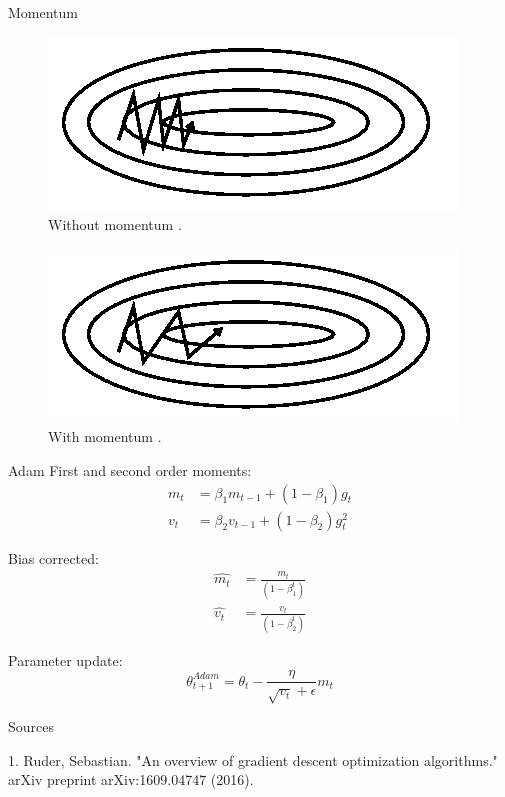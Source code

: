 \documentclass{beamer}
\begin{document}
\begin{frame}{Momentum}

\begin{figure}[h]
\includegraphics[scale=0.70]{img/without_momentum}
\caption{Without momentum \cite{cit:ruder}.}
\end{figure}

\begin{figure}[h]
\includegraphics[scale=0.70]{img/with_momentum}
\caption{With momentum \cite{cit:ruder}.}
\end{figure}

\end{frame}
\begin{frame}{Adam}
First and second order moments:
\begin{equation}\label{eq:adam_moments}
\begin{aligned}
m_t &= \beta_1 m_{t-1} + (1 - \beta_1) g_t\\
v_t &= \beta_2 v_{t-1} + (1 - \beta_2) g_t^2
\end{aligned}
\end{equation}

Bias corrected:
\begin{equation}\label{eq:adam_moments}
\begin{aligned}
\hat{m_t} &= \frac{m_t}{(1 - \beta_1^t)}\\
\hat{v_t} &= \frac{v_t}{(1 - \beta_2^t)}
\end{aligned}
\end{equation}

Parameter update:
\begin{equation}\label{eq:adam_update}
\theta_{t+1}^{Adam} = \theta_{t} - \frac{\eta}{\sqrt{v_t} + \epsilon} m_t
\end{equation}

\end{frame}

\begin{frame}{Sources}

\begin{thebibliography}{0}

   1. Ruder, Sebastian. "An overview of gradient descent optimization algorithms." arXiv preprint arXiv:1609.04747 (2016).
  
\end{thebibliography}

\end{frame}

 
 
 
\end{document}
